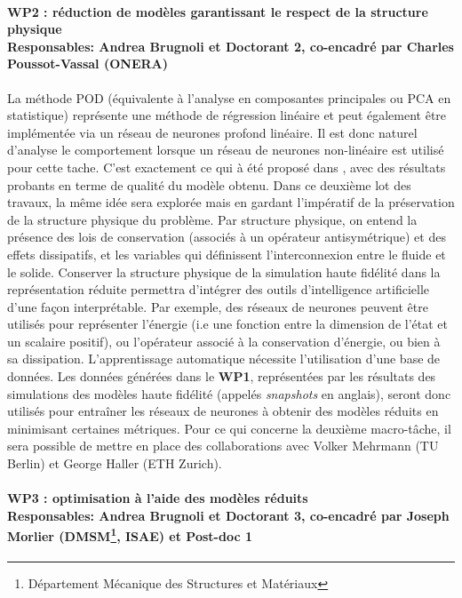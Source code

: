 \documentclass[12pt, french]{article}
\begin{document}
	\paragraph[\large WP2 : réduction de modèles garantissant le respect de la structure physique\\
	Responsables: Andrea Brugnoli et Doctorant 2, co-encadré par Charles Poussot-Vassal (ONERA)]{\large WP2 : réduction de modèles garantissant le respect de la structure physique\\
		Responsables: Andrea Brugnoli et Doctorant 2, co-encadré par Charles Poussot-Vassal (ONERA)\\}
	La méthode POD (équivalente \`a l'analyse en composantes principales ou PCA en statistique) représente une méthode de régression linéaire et peut également être implémentée via un réseau de neurones profond linéaire. Il est donc naturel d'analyse le comportement lorsque un réseau de neurones non-linéaire est utilisé pour cette tache. C'est exactement ce qui \`a été proposé dans \cite{lee2020}, avec des résultats probants en terme de qualité du modèle obtenu. Dans ce deuxième lot des travaux, la même idée sera explorée mais en gardant l'impératif de la préservation de la structure physique du problème.
	\newline\newline
	Par structure physique, on entend la présence des lois de conservation (associés à un opérateur antisymétrique) et des effets dissipatifs, et les variables qui définissent l'interconnexion entre le fluide et le solide. Conserver la structure physique de la simulation haute fidélité dans la représentation réduite permettra d'intégrer des outils d'intelligence artificielle d'une façon interprétable. Par exemple, des réseaux de neurones peuvent être utilisés pour représenter l'énergie (i.e une fonction entre la dimension de l'état et un scalaire positif), ou l'opérateur associé à la conservation d'énergie, ou bien à sa dissipation. L'apprentissage automatique nécessite l'utilisation d'une base de données. Les données générées dans le \textbf{WP1}, représentées par les résultats des simulations des modèles haute fidélité (appelés \textit{snapshots} en anglais), seront donc utilisés pour entraîner les réseaux de neurones à obtenir des modèles réduits en minimisant certaines métriques. 
	Pour ce qui concerne la deuxième macro-tâche, il sera possible de mettre en place des collaborations avec Volker Mehrmann (TU Berlin) et George Haller (ETH Zurich).
	
	
	\paragraph[\large WP3 : optimisation à l'aide des modèles réduits\\
	Responsables: Andrea Brugnoli et Doctorant 3, co-encadré par Joseph Morlier (DMSM, ISAE) et Post-doc 1\\]{\large WP3 : optimisation à l'aide des modèles réduits\\
		Responsables: Andrea Brugnoli et Doctorant 3, co-encadré par Joseph Morlier (DMSM\footnote{Département Mécanique des Structures et Matériaux}, ISAE) et Post-doc 1\\}
\end{document}
